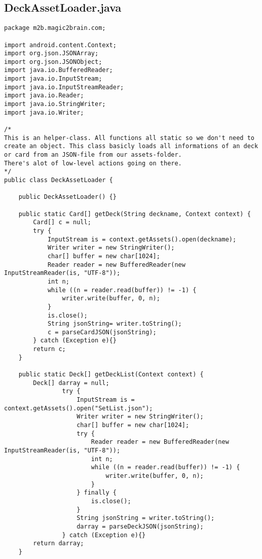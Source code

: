 \subsection*{DeckAssetLoader.java}
\begin{lstlisting}
package m2b.magic2brain.com;

import android.content.Context;
import org.json.JSONArray;
import org.json.JSONObject;
import java.io.BufferedReader;
import java.io.InputStream;
import java.io.InputStreamReader;
import java.io.Reader;
import java.io.StringWriter;
import java.io.Writer;

/*
This is an helper-class. All functions all static so we don't need to create an object. This class basicly loads all informations of an deck or card from an JSON-file from our assets-folder.
There's alot of low-level actions going on there.
*/
public class DeckAssetLoader {

    public DeckAssetLoader() {}

    public static Card[] getDeck(String deckname, Context context) {
        Card[] c = null;
        try {
            InputStream is = context.getAssets().open(deckname);
            Writer writer = new StringWriter();
            char[] buffer = new char[1024];
            Reader reader = new BufferedReader(new InputStreamReader(is, "UTF-8"));
            int n;
            while ((n = reader.read(buffer)) != -1) {
                writer.write(buffer, 0, n);
            }
            is.close();
            String jsonString= writer.toString();
            c = parseCardJSON(jsonString);
        } catch (Exception e){}
        return c;
    }

    public static Deck[] getDeckList(Context context) {
        Deck[] darray = null;
                try {
                    InputStream is = context.getAssets().open("SetList.json");
                    Writer writer = new StringWriter();
                    char[] buffer = new char[1024];
                    try {
                        Reader reader = new BufferedReader(new InputStreamReader(is, "UTF-8"));
                        int n;
                        while ((n = reader.read(buffer)) != -1) {
                            writer.write(buffer, 0, n);
                        }
                    } finally {
                        is.close();
                    }
                    String jsonString = writer.toString();
                    darray = parseDeckJSON(jsonString);
                } catch (Exception e){}
        return darray;
    }


\end{lstlisting}
